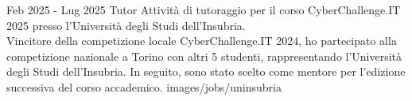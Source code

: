 {Feb 2025 - Lug 2025}
{Tutor}
{Attività di tutoraggio per il corso CyberChallenge.IT 2025 presso l'Università degli Studi dell'Insubria.\\
Vincitore della competizione locale CyberChallenge.IT 2024, ho partecipato alla competizione nazionale a Torino con altri 5 studenti, rappresentando l'Università degli Studi dell'Insubria.
In seguito, sono stato scelto come mentore per l'edizione successiva del corso accademico.}
{images/jobs/uninsubria}
